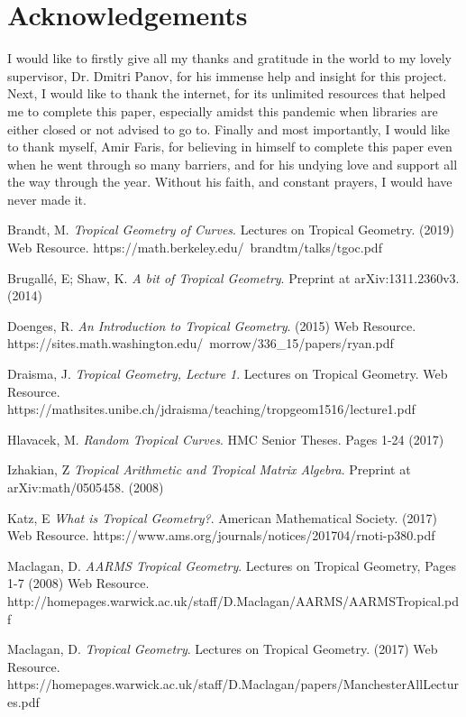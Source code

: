 \documentclass[]{article}
\theoremstyle{definition}
\numberwithin{equation}{section}
\renewcommand{\.}{\,.}
\begin{document}
\section*{Acknowledgements}
I would like to firstly give all my thanks and gratitude in the world to my lovely supervisor, Dr. Dmitri Panov, for his immense help and insight for this project. Next, I would like to thank the internet, for its unlimited resources that helped me to complete this paper, especially amidst this pandemic when libraries are either closed or not advised to go to. Finally and most importantly, I would like to thank myself, Amir Faris, for believing in himself to complete this paper even when he went through so many barriers, and for his undying love and support all the way through the year. Without his faith, and constant prayers, I would have never made it.
\newpage
\begin{thebibliography}{99}
	
Brandt, M. \textit{Tropical Geometry of Curves}. Lectures on Tropical Geometry. (2019) Web Resource. https://math.berkeley.edu/~brandtm/talks/tgoc.pdf 
	
	Brugall\'e, E; Shaw, K. \textit{A bit of Tropical Geometry}. Preprint at arXiv:1311.2360v3. (2014)
	
	Doenges, R. \textit{An Introduction to Tropical Geometry}. (2015) Web Resource. https://sites.math.washington.edu/~morrow/336\_15/papers/ryan.pdf
	
	Draisma, J. \textit{Tropical Geometry, Lecture 1}. Lectures on Tropical Geometry. Web Resource. https://mathsites.unibe.ch/jdraisma/teaching/tropgeom1516/lecture1.pdf 
	
	Hlavacek, M. \textit{Random Tropical Curves}. HMC Senior Theses. Pages 1-24 (2017)
	
	Izhakian, Z \textit{Tropical Arithmetic and Tropical Matrix Algebra}. Preprint at arXiv:math/0505458. (2008) 
	
	Katz, E \textit{What is Tropical Geometry?}. American Mathematical Society. (2017) Web Resource. https://www.ams.org/journals/notices/201704/rnoti-p380.pdf
	
		Maclagan, D. \textit{AARMS Tropical Geometry}. Lectures on Tropical Geometry, Pages 1-7 (2008) Web Resource. http://homepages.warwick.ac.uk/staff/D.Maclagan/AARMS/AARMSTropical.pdf
		
	Maclagan, D. \textit{Tropical Geometry}. Lectures on Tropical Geometry. (2017) Web Resource. https://homepages.warwick.ac.uk/staff/D.Maclagan/papers/ManchesterAllLectures.pdf
	

\end{thebibliography}
\end{document}
